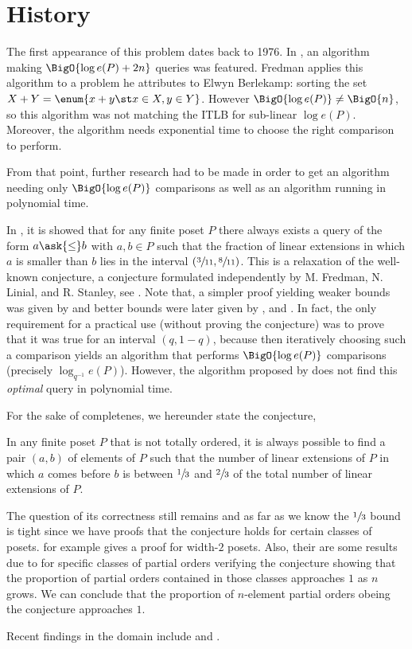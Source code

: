 \section{History}

The first appearance of this problem dates back to 1976. In
\citet*{fredman:1976}, an algorithm making $\BigO{\log e(P) + 2n}$ queries was
featured. Fredman applies this algorithm to a problem he attributes to Elwyn
Berlekamp: sorting the set $X + Y = \enum{x + y \st x \in X, y \in Y}$. However
$\BigO{\log e(P)} \neq \BigO{n}$, so this algorithm was not matching the ITLB
for sub-linear $\log e(P)$. Moreover, the algorithm needs exponential time to
choose the right comparison to perform.

From that point, further research had to be made in order to get an algorithm
needing only $\BigO{\log e(P)}$ comparisons as well as an algorithm running in
polynomial time.

In \citet*{kahn1984balancing}, it is showed that for any finite poset \(P\)
there always exists a query of the form \(a \ask{\leq} b\) with \(a,b \in P\)
such that the fraction of linear extensions in which $a$ is smaller than $b$
lies in the interval $(\sfrac{3}{11}, \sfrac{8}{11})$. This is a relaxation of
the well-known \onethirdtwothird conjecture, a conjecture formulated
independently by M. Fredman, N. Linial, and R. Stanley, see
\citet*{linial:1984}. Note that, a simpler proof yielding weaker
bounds was given by \citet*{kahn1991balancing} and better bounds were later
given by \citet*{brightwell1995balancing}, and \citet*{brightwell1999balanced}.
In fact, the only requirement for a practical use (without proving the
conjecture) was to prove that it was true for an interval $(q, 1-q)$, because
then iteratively choosing such a comparison yields an algorithm that performs
$\BigO{\log e(P)}$ comparisons (precisely $\log_{q^{-1}} e(P)$). However, the
algorithm proposed by \citet*{kahn1984balancing} does not find this
\emph{optimal} query in polynomial time.

For the sake of completenes, we hereunder state the \onethirdtwothird
conjecture,

\begin{conjecture}
In any finite poset $P$ that is not totally ordered, it is always possible to
find a pair $(a,b)$ of elements of $P$ such that the number of linear
extensions of $P$ in which $a$ comes before $b$ is between $\sfrac{1}{3}$ and
$\sfrac{2}{3}$ of the total number of linear extensions of $P$.
\end{conjecture}

The question of its correctness still remains and as far as we know the
$\sfrac{1}{3}$ bound is tight since we have proofs that the conjecture holds
for certain classes of posets. \citet*{linial:1984} for example gives a proof
for width-\(2\) posets. Also, their are some results due to
\citet*{peczarski:2006} for specific classes of partial orders verifying the
conjecture showing that the proportion of partial orders contained in those
classes approaches $1$ as $n$ grows. We can conclude that the proportion of
$n$-element partial orders obeing the \onethirdtwothird conjecture approaches
$1$.

Recent findings in the domain include \citet*{zaguia:2011} and
\citet*{peczarski:2008}.
